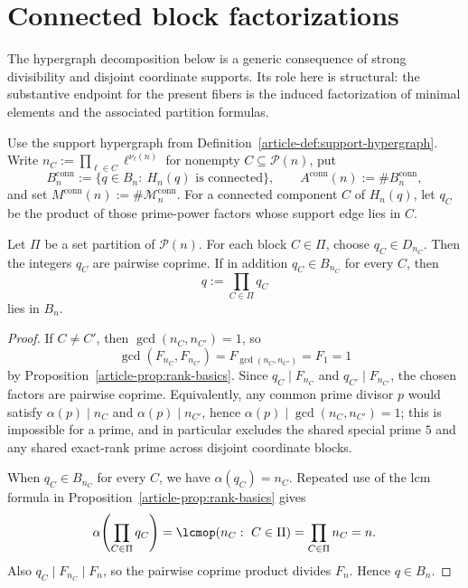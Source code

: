 \section{Connected block factorizations}\label{sec:connected}

The hypergraph decomposition below is a generic consequence of strong
divisibility and disjoint coordinate supports. Its role here is structural:
the substantive endpoint for the present fibers is the induced factorization
of minimal elements and the associated partition formulas.

Use the support hypergraph from
Definition~\ref{article-def:support-hypergraph}.  Write
$n_C:=\prod_{\ell\in C}\ell^{\nu_\ell(n)}$ for nonempty
$C\subseteq\mathcal P(n)$, put
\[
B_n^{\mathrm{conn}}:=\{q\in B_n:\ H_n(q)\text{ is connected}\},\qquad
A^{\mathrm{conn}}(n):=\#B_n^{\mathrm{conn}},
\]
and set $M^{\mathrm{conn}}(n):=\#\mathcal M_n^{\mathrm{conn}}$.
For a connected component $C$ of $H_n(q)$, let $q_C$ be the product of
those prime-power factors whose support edge lies in $C$.

\begin{lemma}\label{thm:coprime-embedding}
Let $\Pi$ be a set partition of $\mathcal P(n)$. For each block
$C\in\Pi$, choose $q_C\in D_{n_C}$. Then the integers $q_C$ are pairwise
coprime. If in addition $q_C\in B_{n_C}$ for every $C$, then
\[
q:=\prod_{C\in\Pi}q_C
\]
lies in $B_n$.
\end{lemma}

\begin{proof}
If $C\ne C'$, then $\gcd(n_C,n_{C'})=1$, so
\[
\gcd(F_{n_C},F_{n_{C'}})=F_{\gcd(n_C,n_{C'})}=F_1=1
\]
by Proposition~\ref{article-prop:rank-basics}. Since $q_C\mid F_{n_C}$ and
$q_{C'}\mid F_{n_{C'}}$, the chosen factors are pairwise coprime.
Equivalently, any common prime divisor $p$ would satisfy
$\alpha(p)\mid n_C$ and $\alpha(p)\mid n_{C'}$, hence
$\alpha(p)\mid\gcd(n_C,n_{C'})=1$; this is impossible for a prime, and in
particular excludes the shared special prime $5$ and any shared exact-rank prime
across disjoint coordinate blocks.

When $q_C\in B_{n_C}$ for every $C$, we have $\alpha(q_C)=n_C$. Repeated use
of the lcm formula in Proposition~\ref{article-prop:rank-basics} gives
\[
\alpha\!\left(\prod_{C\in\Pi}q_C\right)
=\lcmop(n_C:\ C\in\Pi)=\prod_{C\in\Pi}n_C=n.
\]
Also $q_C\mid F_{n_C}\mid F_n$, so the pairwise coprime product divides
$F_n$. Hence $q\in B_n$.
\end{proof}

